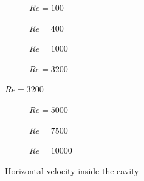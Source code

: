 \begin{figure}[h]
	\centering
	\begin{subfigure}{0.5\textwidth}
		\resizebox{1.4\textwidth}{!}{}
		\caption{$Re=100$}
	\end{subfigure}%
	\begin{subfigure}{0.5\textwidth}
		\resizebox{1.4\textwidth}{!}{}
		\caption{$Re=400$}
	\end{subfigure}
	\begin{subfigure}{0.5\textwidth}
		\resizebox{1.4\textwidth}{!}{}
		\caption{$Re=1000$}
	\end{subfigure}%
	\begin{subfigure}{0.5\textwidth}
		\resizebox{1.4\textwidth}{!}{}
		\caption{$Re=3200$}
	\end{subfigure}
\end{figure}
\begin{figure}\ContinuedFloat
	\begin{subfigure}{0.5\textwidth}
		\resizebox{1.4\textwidth}{!}{}
		\caption{$Re=5000$}
	\end{subfigure}%
	\begin{subfigure}{0.5\textwidth}
		\resizebox{1.4\textwidth}{!}{}
		\caption{$Re=7500$}
	\end{subfigure}
	\begin{subfigure}{0.5\textwidth}
		\center
		\resizebox{1.4\textwidth}{!}{}
		\caption{$Re=10000$}
	\end{subfigure}
	\caption{Horizontal velocity inside the cavity}
\end{figure}

